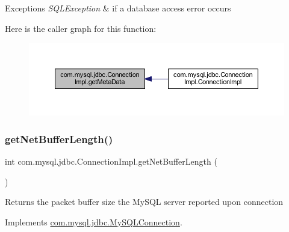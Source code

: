 \begin{DoxyExceptions}{Exceptions}
{\em S\+Q\+L\+Exception} & if a database access error occurs \\
\hline
\end{DoxyExceptions}
Here is the caller graph for this function\+:\nopagebreak
\begin{figure}[H]
\begin{center}
\leavevmode
\includegraphics[width=350pt]{classcom_1_1mysql_1_1jdbc_1_1_connection_impl_aa16ed222f78d8d0202446aafb5330612_icgraph}
\end{center}
\end{figure}
\mbox{\label{classcom_1_1mysql_1_1jdbc_1_1_connection_impl_a3d522b6620717a4b7f9119a7931bec5e}} 
\subsubsection{\texorpdfstring{get\+Net\+Buffer\+Length()}{getNetBufferLength()}}
{\footnotesize\ttfamily int com.\+mysql.\+jdbc.\+Connection\+Impl.\+get\+Net\+Buffer\+Length (\begin{DoxyParamCaption}{ }\end{DoxyParamCaption})}

Returns the packet buffer size the My\+S\+QL server reported upon connection 

Implements \mbox{\hyperlink{interfacecom_1_1mysql_1_1jdbc_1_1_my_s_q_l_connection}{com.\+mysql.\+jdbc.\+My\+S\+Q\+L\+Connection}}.

\mbox{\label{classcom_1_1mysql_1_1jdbc_1_1_connection_impl_ad1bdffcbc78f4b474b82f76101ebdf63}} 
